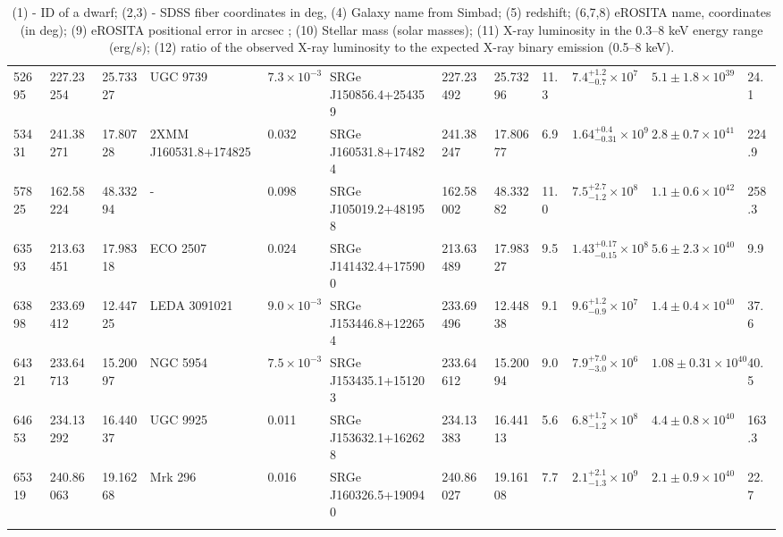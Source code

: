 \begin{longtable}{llllllllllll}
52695 & 227.23254 & 25.73327 & UGC  9739 & $7.3\times10^{-3}$ & SRGe J150856.4+254359 & 227.23492 & 25.73296 & 11.3 & $7.4^{+1.2}_{-0.7}\times10^{7}$ & $5.1\pm1.8\times10^{39}$ & 24.1 \\
53431 & 241.38271 & 17.80728 & 2XMM J160531.8+174825 & 0.032 & SRGe J160531.8+174824 & 241.38247 & 17.80677 & 6.9 & $1.64^{+0.4}_{-0.31}\times10^{9}$ & $2.8\pm0.7\times10^{41}$ & 224.9 \\
57825 & 162.58224 & 48.33294 & - & 0.098 & SRGe J105019.2+481958 & 162.58002 & 48.33282 & 11.0 & $7.5^{+2.7}_{-1.2}\times10^{8}$ & $1.1\pm0.6\times10^{42}$ & 258.3 \\
63593 & 213.63451 & 17.98318 & ECO 2507 & 0.024 & SRGe J141432.4+175900 & 213.63489 & 17.98327 & 9.5 & $1.43^{+0.17}_{-0.15}\times10^{8}$ & $5.6\pm2.3\times10^{40}$ & 9.9 \\
63898 & 233.69412 & 12.44725 & LEDA 3091021 & $9.0\times10^{-3}$ & SRGe J153446.8+122654 & 233.69496 & 12.44838 & 9.1 & $9.6^{+1.2}_{-0.9}\times10^{7}$ & $1.4\pm0.4\times10^{40}$ & 37.6 \\
64321 & 233.64713 & 15.20097 & NGC  5954 & $7.5\times10^{-3}$ & SRGe J153435.1+151203 & 233.64612 & 15.20094 & 9.0 & $7.9^{+7.0}_{-3.0}\times10^{6}$ & $1.08\pm0.31\times10^{40}$ & 40.5 \\
64653 & 234.13292 & 16.44037 & UGC  9925 & 0.011 & SRGe J153632.1+162628 & 234.13383 & 16.44113 & 5.6 & $6.8^{+1.7}_{-1.2}\times10^{8}$ & $4.4\pm0.8\times10^{40}$ & 163.3 \\
65319 & 240.86063 & 19.16268 & Mrk  296 & 0.016 & SRGe J160326.5+190940 & 240.86027 & 19.16108 & 7.7 & $2.1^{+2.1}_{-1.3}\times10^{9}$ & $2.1\pm0.9\times10^{40}$ & 22.7 \\


 \caption{(1) - ID of a dwarf; (2,3) - SDSS fiber coordinates in deg, (4) Galaxy name from Simbad; (5) redshift; (6,7,8) eROSITA name, coordinates (in deg); (9) eROSITA positional error in arcsec ; (10) Stellar mass (solar masses); (11)  X-ray luminosity in the 0.3--8 keV energy range (erg/s); (12) ratio of the observed X-ray luminosity to the expected X-ray binary emission (0.5--8 keV).}
\end{longtable}
